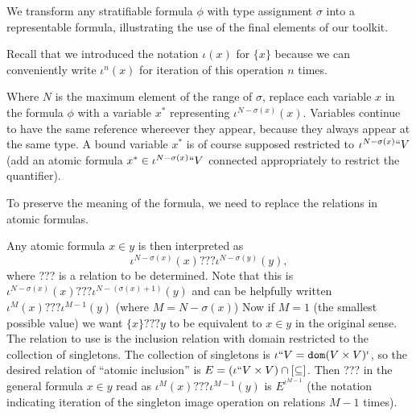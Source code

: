 \documentclass{slides}
\begin{document}
\begin{slide}

We transform any stratifiable formula $\phi$ with type assignment $\sigma$ into a representable formula, illustrating the use of the final elements of our toolkit.

Recall that we introduced the notation $\iota(x)$ for $\{x\}$ because we can conveniently write $\iota^n(x)$ for iteration of this operation $n$ times.

Where $N$ is the maximum element of the range of $\sigma$, replace each variable $x$  in the formula $\phi$ with a variable $x^*$ representing $\iota^{N-\sigma(x)}(x)$.  Variables continue to have the same reference whereever they appear, because they always appear at the same type.  A bound variable $x^*$ is of course supposed restricted to $\iota^{N-\sigma(x)}``V$ (add an atomic formula
$x^* \in \iota^{N-\sigma(x)}``V$ connected appropriately to restrict the quantifier).

To preserve the meaning of the formula, we need to replace the relations in atomic formulas.
\end{slide}

\begin{slide}

Any atomic formula $x \in y$ is then interpreted as $$\iota^{N-\sigma(x)}(x) ???\iota^{N-\sigma(y)}(y),$$  where ??? is a relation to be determined.  Note that this
is  $\iota^{N-\sigma(x)}(x) ??? \iota^{N-(\sigma(x)+1)}(y)$ and can be helpfully written $\iota^M(x) ??? \iota^{M-1}(y)$ (where $M=N-\sigma(x)$)  Now if $M=1$ (the smallest possible value) we want $\{x\} ??? y$ to be equivalent to $x \in y$ in the original sense.
The relation to use is the inclusion relation with domain restricted to the collection of singletons.  The collection of singletons
is $\iota``V= {\tt dom}(V \times V)^{\iota}$, so the desired relation of ``atomic inclusion'' is $E = (\iota``V \times V) \cap [\subseteq]$.
Then ??? in the general formula $x\in y$ read as $\iota^M(x) ??? \iota^{M-1}(y)$ is $E^{\iota^{M-1}}$ (the notation indicating iteration of the singleton image operation on relations $M-1$ times).  

\end{slide}
\end{document}
